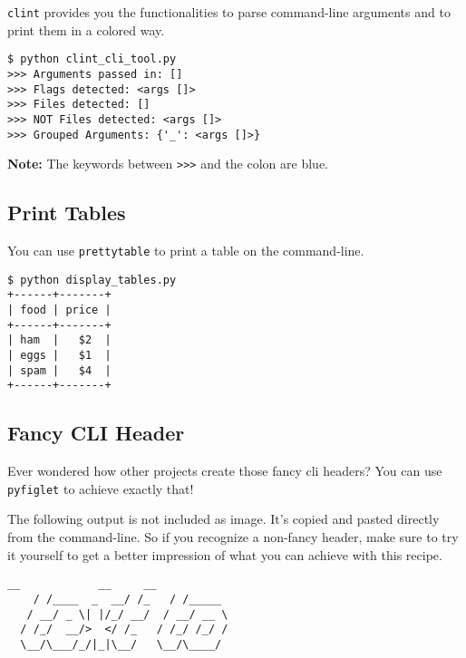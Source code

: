 \lstinline{clint} provides you the functionalities to parse command-line arguments and to print them in a colored way.



\begin{lstlisting}[caption=Output of clint\_cli\_tool.py]
$ python clint_cli_tool.py
>>> Arguments passed in: []
>>> Flags detected: <args []>
>>> Files detected: []
>>> NOT Files detected: <args []>
>>> Grouped Arguments: {'_': <args []>}
\end{lstlisting}

\textbf{Note:} The keywords between \lstinline{>>>} and the colon are blue.


\subsection{Print Tables}

You can use \lstinline{prettytable} to print a table on the command-line.



\begin{lstlisting}[caption=Output of display\_tables.py]
$ python display_tables.py
+------+-------+
| food | price |
+------+-------+
| ham  |   $2  |
| eggs |   $1  |
| spam |   $4  |
+------+-------+
\end{lstlisting}


\subsection{Fancy CLI Header}

Ever wondered how other projects create those fancy cli headers?
You can use \lstinline{pyfiglet} to achieve exactly that!



The following output is not included as image.
It's copied and pasted directly from the command-line.
So if you recognize a non-fancy header, make sure to try it yourself to get a better impression of what you can achieve with this recipe.

\begin{minipage}{\textwidth}
\begin{lstlisting}[caption=Output of fancy\_cli\_header.py]
    __            __     __       
    / /____  _  __/ /_   / /_____  
   / __/ _ \| |/_/ __/  / __/ __ \ 
  / /_/  __/>  </ /_   / /_/ /_/ / 
  \__/\___/_/|_|\__/   \__/\____/     
                                                                     
\end{lstlisting}
\end{minipage}


